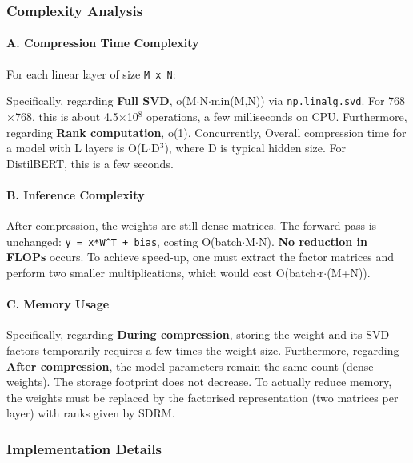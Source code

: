 \subsubsection*{Complexity Analysis}

\paragraph{A. Compression Time Complexity}

For each linear layer of size \texttt{M x N}:

Specifically, regarding \textbf{Full SVD}, o(M$\cdot$N$\cdot$min(M,N)) via \texttt{np.linalg.svd}. For 768$\times$768, this is about 4.5$\times$10$^8$ operations, a few milliseconds on CPU. Furthermore, regarding \textbf{Rank computation}, o(1). Concurrently, Overall compression time for a model with L layers is O(L$\cdot$D$^3$), where D is typical hidden size. For DistilBERT, this is a few seconds.


\paragraph{B. Inference Complexity}

After compression, the weights are still dense matrices. The forward pass is unchanged: \texttt{y = x*W\textasciicircum{}T + bias}, costing O(batch$\cdot$M$\cdot$N). \textbf{No reduction in FLOPs} occurs. To achieve speed-up, one must extract the factor matrices and perform two smaller multiplications, which would cost O(batch$\cdot$r$\cdot$(M+N)).

\paragraph{C. Memory Usage}

Specifically, regarding \textbf{During compression}, storing the weight and its SVD factors temporarily requires a few times the weight size. Furthermore, regarding \textbf{After compression}, the model parameters remain the same count (dense weights). The storage footprint does not decrease. To actually reduce memory, the weights must be replaced by the factorised representation (two matrices per layer) with ranks given by SDRM.



\subsubsection*{Implementation Details}

